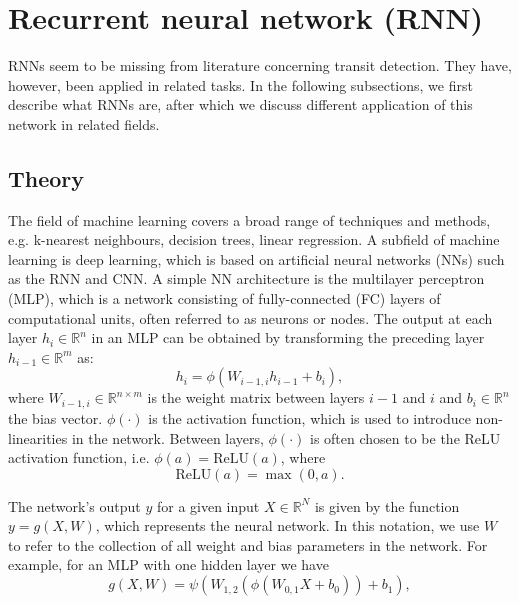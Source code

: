 
\section{Recurrent neural network (RNN)}

RNNs seem to be missing from literature concerning transit detection. They have, however, been applied in related tasks. In the following subsections, we first describe what RNNs are, after which we discuss different application of this network in related fields.

\subsection{Theory}

\noindent The field of machine learning covers a broad range of techniques and methods, e.g. k-nearest neighbours, decision trees, linear regression. A subfield of machine learning is deep learning, which is based on artificial neural networks (NNs) such as the RNN and CNN. A simple NN architecture is the multilayer perceptron (MLP), which is a network consisting of fully-connected (FC) layers of computational units, often referred to as neurons or nodes. The output at each layer $h_{i} \in \mathbb{R}^{n}$ in an MLP can be obtained by transforming the preceding layer $h_{i-1} \in \mathbb{R}^{m}$ as:
\begin{equation}
    h_{i} = \phi(W_{i-1,i} h_{i-1} + b_{i}),
\end{equation}
where $W_{i-1,i} \in \mathbb{R}^{n \times m}$ is the weight matrix between layers $i-1$ and $i$ and $b_{i} \in \mathbb{R}^n$ the bias vector. $\phi(\cdot)$ is the activation function, which is used to introduce non-linearities in the network. Between layers, $\phi(\cdot)$ is often chosen to be the ReLU activation function, i.e. $\phi(a) = \text{ReLU}(a)$, where
\begin{equation}
    \text{ReLU}(a) = \max (0, a).
\end{equation}

The network's output $y$ for a given input $X \in \mathbb{R}^N$ is given by the function $y = g(X, W)$, which represents the neural network. In this notation, we use $W$ to refer to the collection of all weight and bias parameters in the network. For example, for an MLP with one hidden layer we have  
\begin{equation}
    \label{eq:mlp_function}
    g(X, W) = \psi(W_{1,2} (\phi(W_{0,1} X + b_{0})) + b_{1}),
\end{equation}

